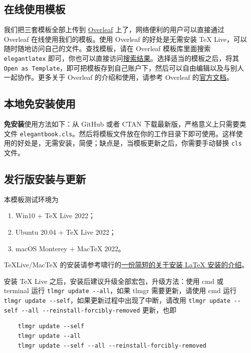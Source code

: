 \documentclass[lang=cn,newtx,10pt,scheme=chinese]{elegantbook}
\begin{document}
\subsection{在线使用模板}

我们把三套模板全部上传到 \href{https://www.overleaf.com/}{Overleaf} 上了，网络便利的用户可以直接通过 Overleaf 在线使用我们的模板。使用 Overleaf 的好处是无需安装 \TeX{} Live，可以随时随地访问自己的文件。查找模板，请在 Overleaf 模板库里面搜索 \lstinline{elegantlatex} 即可，你也可以直接访问\href{https://www.overleaf.com/latex/templates?addsearch=elegantlatex}{搜索结果}。选择适当的模板之后，将其 \lstinline{Open as Template}，即可把模板存到自己账户下，然后可以自由编辑以及与别人一起协作。更多关于 Overleaf 的介绍和使用，请参考 Overleaf 的\href{https://www.overleaf.com/learn}{官方文档}。

\subsection{本地免安装使用}

\textbf{免安装}使用方法如下：从 GitHub 或者 CTAN 下载最新版，严格意义上只需要类文件 \lstinline{elegantbook.cls}。然后将模板文件放在你的工作目录下即可使用。这样使用的好处是，无需安装，简便；缺点是，当模板更新之后，你需要手动替换 \lstinline{cls} 文件。

\subsection{发行版安装与更新}

本模板测试环境为 
\begin{enumerate}
	\item Win10 + \TeX{} Live 2022；
	\item Ubuntu 20.04 + \TeX{} Live 2022；
	\item macOS Monterey + Mac\TeX{} 2022。
\end{enumerate}

\TeX Live/Mac\TeX{} 的安装请参考啸行的\href{https://github.com/OsbertWang/install-latex-guide-zh-cn/releases/}{一份简短的关于安装 \LaTeX{} 安装的介绍}。

安装 \TeX{} Live 之后，安装后建议升级全部宏包，升级方法：使用 cmd 或 terminal 运行 \lstinline{tlmgr update --all}，如果 tlmgr 需要更新，请使用 cmd 运行 \lstinline{tlmgr update --self}，如果更新过程中出现了中断，请改用 \lstinline{tlmgr update --self --all --reinstall-forcibly-removed} 更新，也即

\begin{lstlisting}
	tlmgr update --self 
	tlmgr update --all
	tlmgr update --self --all --reinstall-forcibly-removed
\end{lstlisting}
\end{document}
